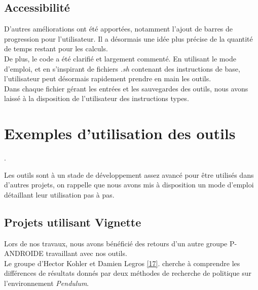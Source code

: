 \documentclass[12pt]{article}
\begin{document}

\newpage
\subsection{Accessibilité}

D’autres améliorations ont été apportées, notamment l’ajout de barres de progression pour l’utilisateur. Il a désormais une idée plus précise de la quantité de temps restant pour les calculs. \\

De plus, le code a été clarifié et largement commenté. En utilisant le mode d'emploi, et en s'inspirant de fichiers \emph{.sh} contenant des instructions de base, l'utilisateur peut désormais rapidement prendre en main les outils. \\

Dans chaque fichier gérant les entrées et les sauvegardes des outils, nous avons laissé à la disposition de l'utilisateur des instructions types. \\

\section{Exemples d'utilisation des outils} \label{Exemples}.

Les outils sont à un stade de développement assez avancé pour être utilisés dans d'autres projets, on rappelle que nous avons mis à disposition un mode d'emploi détaillant leur utilisation pas à pas. \\

\subsection{Projets utilisant Vignette}

Lors de nos travaux, nous avons bénéficié des retours d'un autre groupe P-ANDROIDE travaillant avec nos outils. \\

Le groupe d'Hector Kohler et Damien Legros \href{https://github.com/KohlerHECTOR/PANDROIDE}{[17]}. cherche à comprendre les différences de résultats donnés par deux méthodes de recherche de politique sur l'environnement \emph{Pendulum}. \\
\end{document}
